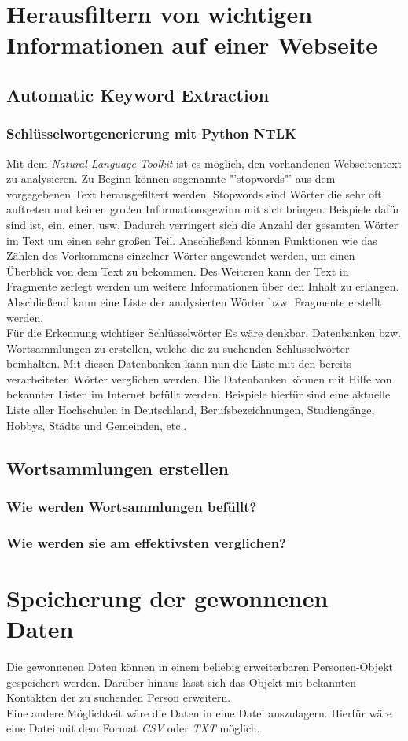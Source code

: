 \section{Herausfiltern von wichtigen Informationen auf einer Webseite}
	\subsection{Automatic Keyword Extraction}%
		\subsubsection{Schlüsselwortgenerierung mit Python NTLK}
		Mit dem \textit{Natural Language Toolkit} ist es möglich, den vorhandenen Webseitentext zu analysieren. Zu Beginn können sogenannte "'stopwords"' aus dem vorgegebenen Text herausgefiltert werden. Stopwords sind Wörter die sehr oft auftreten und keinen großen Informationsgewinn mit sich bringen. Beispiele dafür sind ist, ein, einer, usw. Dadurch verringert sich die Anzahl der gesamten Wörter im Text um einen sehr großen Teil. Anschließend können Funktionen wie das Zählen des Vorkommens einzelner Wörter angewendet werden, um einen Überblick von dem Text zu bekommen. Des Weiteren kann der Text in Fragmente zerlegt werden um weitere Informationen über den Inhalt zu erlangen. Abschließend kann eine Liste der analysierten Wörter bzw. Fragmente erstellt werden.\\
		Für die Erkennung wichtiger Schlüsselwörter
		Es wäre denkbar, Datenbanken bzw. Wortsammlungen zu erstellen, welche die zu suchenden Schlüsselwörter beinhalten. Mit diesen Datenbanken kann nun die Liste mit den bereits verarbeiteten Wörter verglichen werden. Die Datenbanken können mit Hilfe von bekannter Listen im Internet befüllt werden. Beispiele hierfür sind eine aktuelle Liste aller Hochschulen in Deutschland, Berufsbezeichnungen, Studiengänge, Hobbys, Städte und Gemeinden, etc..
	\subsection{Wortsammlungen erstellen}
		\subsubsection{Wie werden Wortsammlungen befüllt?}
		\subsubsection{Wie werden sie am effektivsten verglichen?}

\section{Speicherung der gewonnenen Daten}
	Die gewonnenen Daten können in einem beliebig erweiterbaren Personen-Objekt gespeichert werden. Darüber hinaus lässt sich das Objekt mit bekannten Kontakten der zu suchenden Person erweitern.\\
	Eine andere Möglichkeit wäre die Daten in eine Datei auszulagern. Hierfür wäre eine Datei mit dem Format \textit{CSV} oder \textit{TXT} möglich.